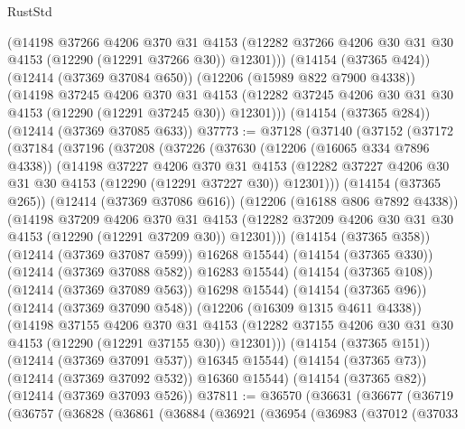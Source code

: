 \begin{lexlean}{RustStd}
\begin{coremodule}
{\begin{coremodule}
{{{{{{{{{{{{{{{{{{{{{{{{{{{{{{{{{{{{{{{{{{{{{{{{{{        (@14198
          @37266
          @4206
          @370
          @31
          @4153
          (@12282 @37266 @4206 @30 @31 @30 @4153 (@12290 (@12291 @37266 @30)) @12301)))
      (@14154 (@37365 @424))
      (@12414 (@37369 @37084 @650))
      (@12206 (@15989 @822 @7900 @4338))
      (@14198
        @37245
        @4206
        @370
        @31
        @4153
        (@12282 @37245 @4206 @30 @31 @30 @4153 (@12290 (@12291 @37245 @30)) @12301)))
    (@14154 (@37365 @284))
    (@12414 (@37369 @37085 @633))
@37773 := @37128
    (@37140
      (@37152
        (@37172
          (@37184
            (@37196
              (@37208
                (@37226
                  (@37630
                    (@12206 (@16065 @334 @7896 @4338))
                    (@14198
                      @37227
                      @4206
                      @370
                      @31
                      @4153
                      (@12282 @37227 @4206 @30 @31 @30 @4153 (@12290 (@12291 @37227 @30)) @12301)))
                  (@14154 (@37365 @265))
                  (@12414 (@37369 @37086 @616))
                  (@12206 (@16188 @806 @7892 @4338))
                  (@14198
                    @37209
                    @4206
                    @370
                    @31
                    @4153
                    (@12282 @37209 @4206 @30 @31 @30 @4153 (@12290 (@12291 @37209 @30)) @12301)))
                (@14154 (@37365 @358))
                (@12414 (@37369 @37087 @599))
                @16268
                @15544)
              (@14154 (@37365 @330))
              (@12414 (@37369 @37088 @582))
              @16283
              @15544)
            (@14154 (@37365 @108))
            (@12414 (@37369 @37089 @563))
            @16298
            @15544)
          (@14154 (@37365 @96))
          (@12414 (@37369 @37090 @548))
          (@12206 (@16309 @1315 @4611 @4338))
          (@14198
            @37155
            @4206
            @370
            @31
            @4153
            (@12282 @37155 @4206 @30 @31 @30 @4153 (@12290 (@12291 @37155 @30)) @12301)))
        (@14154 (@37365 @151))
        (@12414 (@37369 @37091 @537))
        @16345
        @15544)
      (@14154 (@37365 @73))
      (@12414 (@37369 @37092 @532))
      @16360
      @15544)
    (@14154 (@37365 @82))
    (@12414 (@37369 @37093 @526))
@37811 := @36570
    (@36631
      (@36677
        (@36719
          (@36757
            (@36828
              (@36861
                (@36884
                  (@36921
                    (@36954
                      (@36983
                        (@37012
                          (@37033
}}}}}}}}}}}}}}}}}}}}}}}}}}}}}}}}}}}}}}}}}}}}}}}}}}
\end{coremodule}}
\end{coremodule}
\end{lexlean}
